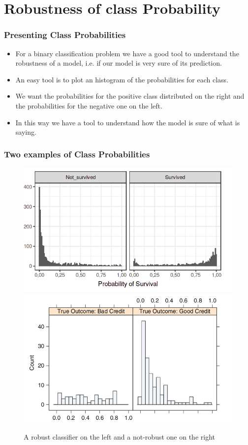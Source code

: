 \documentclass[9pt]{beamer}
\begin{document}
\section{Robustness of class Probability}
\begin{frame}
\frametitle{Presenting Class Probabilities}
\begin{itemize}
\item For a binary classification problem we have a good tool to understand the robustness of a model, i.e. if our model is very sure of its prediction.
\item An easy tool is to plot an histogram of the probabilities for each class.
\item We want the probabilities for the positive class distributed on the right and the probabilities for the negative one on the left.
\item In this way we have a tool to understand how the model is sure of what is saying.
\end{itemize}
\end{frame}
\begin{frame}
\frametitle{Two examples of Class Probabilities}
\begin{figure}[ht]
\includegraphics[scale=0.30]{images/goodexample.png}
\includegraphics[scale=0.25]{images/robustnessprob.png}
\caption{A robust classifier on the left and a not-robust one on the right}
\end{figure}
\end{frame}
\end{document}

